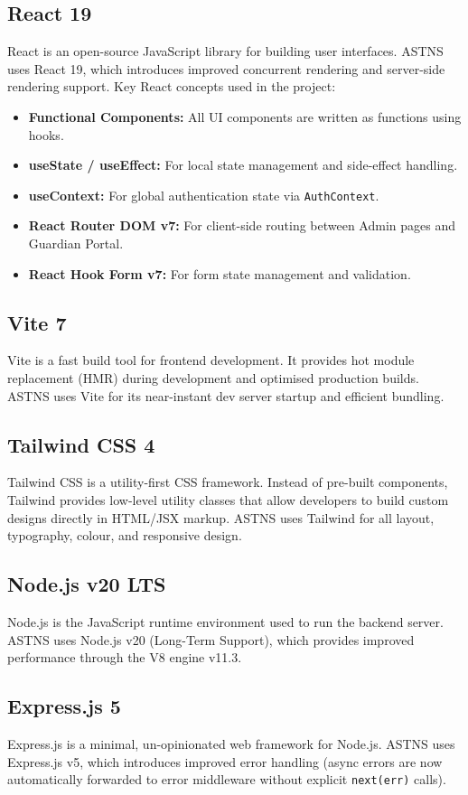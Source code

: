 \documentclass[12pt,a4paper]{report}
\begin{document}
\subsection{React 19}
React is an open-source JavaScript library for building user interfaces. ASTNS uses React 19, which introduces improved concurrent rendering and server-side rendering support. Key React concepts used in the project:
\begin{itemize}
  \item \textbf{Functional Components:} All UI components are written as functions using hooks.
  \item \textbf{useState / useEffect:} For local state management and side-effect handling.
  \item \textbf{useContext:} For global authentication state via \texttt{AuthContext}.
  \item \textbf{React Router DOM v7:} For client-side routing between Admin pages and Guardian Portal.
  \item \textbf{React Hook Form v7:} For form state management and validation.
\end{itemize}

\subsection{Vite 7}
Vite is a fast build tool for frontend development. It provides hot module replacement (HMR) during development and optimised production builds. ASTNS uses Vite for its near-instant dev server startup and efficient bundling.

\subsection{Tailwind CSS 4}
Tailwind CSS is a utility-first CSS framework. Instead of pre-built components, Tailwind provides low-level utility classes that allow developers to build custom designs directly in HTML/JSX markup. ASTNS uses Tailwind for all layout, typography, colour, and responsive design.

\subsection{Node.js v20 LTS}
Node.js is the JavaScript runtime environment used to run the backend server. ASTNS uses Node.js v20 (Long-Term Support), which provides improved performance through the V8 engine v11.3.

\subsection{Express.js 5}
Express.js is a minimal, un-opinionated web framework for Node.js. ASTNS uses Express.js v5, which introduces improved error handling (async errors are now automatically forwarded to error middleware without explicit \texttt{next(err)} calls).
\end{document}

